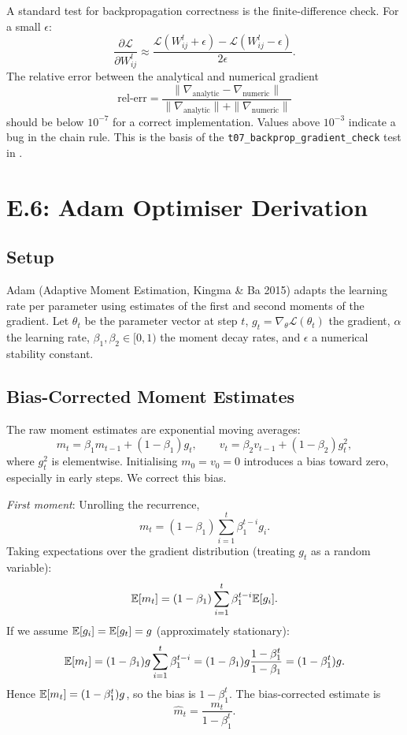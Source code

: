 A standard test for backpropagation correctness is the finite-difference
check. For a small $\epsilon$:
\[
\frac{\partial \mathcal{L}}{\partial W^l_{ij}} \approx \frac{\mathcal{L}(W^l_{ij} + \epsilon) - \mathcal{L}(W^l_{ij} - \epsilon)}{2 \epsilon}.
\]
The relative error between the analytical and numerical gradient
\[
\text{rel-err} = \frac{\| \nabla_{\text{analytic}} - \nabla_{\text{numeric}} \|}{\| \nabla_{\text{analytic}} \| + \| \nabla_{\text{numeric}} \|}
\]
should be below $10^{-7}$ for a correct implementation. Values above
$10^{-3}$ indicate a bug in the chain rule. This is the basis of the
\texttt{t07\_backprop\_gradient\_check} test in .

\section{E.6: Adam Optimiser Derivation}

\subsection{Setup}

Adam (Adaptive Moment Estimation, Kingma \& Ba 2015) adapts the
learning rate per parameter using estimates of the first and second
moments of the gradient. Let $\theta_t$ be the parameter vector at
step $t$, $g_t = \nabla_{\theta} \mathcal{L}(\theta_t)$ the gradient,
$\alpha$ the learning rate, $\beta_1, \beta_2 \in [0, 1)$ the moment
decay rates, and $\epsilon$ a numerical stability constant.

\subsection{Bias-Corrected Moment Estimates}

The raw moment estimates are exponential moving averages:
\[
m_t = \beta_1 m_{t-1} + (1 - \beta_1) g_t, \qquad v_t = \beta_2 v_{t-1} + (1 - \beta_2) g_t^2,
\]
where $g_t^2$ is elementwise. Initialising $m_0 = v_0 = 0$ introduces a
bias toward zero, especially in early steps. We correct this bias.

\emph{First moment}: Unrolling the recurrence,
\[
m_t = (1 - \beta_1) \sum_{i=1}^{t} \beta_1^{t-i} g_i.
\]
Taking expectations over the gradient distribution (treating $g_t$ as
a random variable):
\[
\mathbb{E}[m_t] = (1 - \beta_1) \sum_{i=1}^{t} \beta_1^{t-i} \mathbb{E}[g_i].
\]
If we assume $\mathbb{E}[g_i] = \mathbb{E}[g_t] = g$ (approximately stationary):
\[
\mathbb{E}[m_t] = (1 - \beta_1) g \sum_{i=1}^{t} \beta_1^{t-i} = (1 - \beta_1) g \frac{1 - \beta_1^t}{1 - \beta_1} = (1 - \beta_1^t) g.
\]
Hence $\mathbb{E}[m_t] = (1 - \beta_1^t) g$, so the bias is $1 - \beta_1^t$.
The bias-corrected estimate is
\[
\hat{m}_t = \frac{m_t}{1 - \beta_1^t}.
\]


